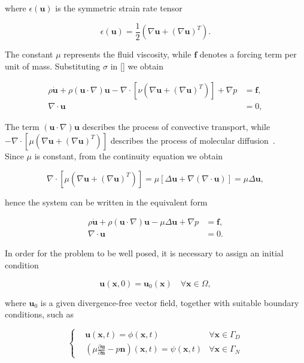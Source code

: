 \documentclass[11pt,a4paper,titlepage]{report}
\begin{document}
where $\epsilon(\mathbf{u})$ is the symmetric strain rate tensor

\[
\epsilon(\mathbf{u}) = \frac{1}{2} (\nabla \mathbf{u} + (\nabla \mathbf{u})^T).
\]

The constant $\mu$ represents the fluid viscosity, while $\mathbf{f}$ denotes a forcing term per unit of mass. Substituting $\sigma$ in \eqref{} we obtain

\begin{align}
\rho \dot{\mathbf{u}} + \rho ( \mathbf{u} \cdot \nabla) \mathbf{u} - \nabla \cdot [ \nu (\nabla \mathbf{u} + (\nabla  \mathbf{u})^T)] +  \nabla p &= \mathbf{f},  \\
\nabla \cdot \mathbf{u} &= 0,
\end{align}

The term $(\mathbf{u} \cdot \nabla)\mathbf{u}$ describes the process of convective transport, while $- \nabla \cdot [ \mu (\nabla \mathbf{u} + (\nabla  \mathbf{u})^T)] $ describes the process of molecular diffusion~\cite{}.\\
Since $\mu$ is constant, from the continuity equation we obtain

\[
\nabla \cdot [ \mu (\nabla \mathbf{u} + (\nabla  \mathbf{u})^T)] = \mu [\Delta \mathbf{u} + \nabla(\nabla \cdot \mathbf{u})] = \mu \Delta \mathbf{u},
\]

hence the system can be written in the equivalent form

\begin{align}
\rho \dot{\mathbf{u}} + \rho ( \mathbf{u} \cdot \nabla) \mathbf{u} - \mu \Delta \mathbf{u} +  \nabla p &= \mathbf{f}, \\
\nabla \cdot \mathbf{u} &= 0.
\end{align}

In order for the problem to be well posed, it is necessary to assign an initial condition

\[
\mathbf{u} (\mathbf{x}, 0) = \mathbf{u}_0(\mathbf{x}) \quad \forall \mathbf{x} \in \Omega,
\]

where $\mathbf{u}_0$ is a given divergence-free vector field, together with suitable boundary conditions, such as

\[
\left\{
\begin{aligned}
& \mathbf{u}(\mathbf{x},t) = \phi (\mathbf{x}, t) & \forall \mathbf{x} \in \Gamma_D \\
& \left( \mu \frac{\partial \mathbf{u}}{\partial \mathbf{n}} - p\mathbf{n} \right) (\mathbf{x},t) = \psi(\mathbf{x},t) & \forall \mathbf{x} \in \Gamma_N
\end{aligned}
\right.
\]
\end{document}
